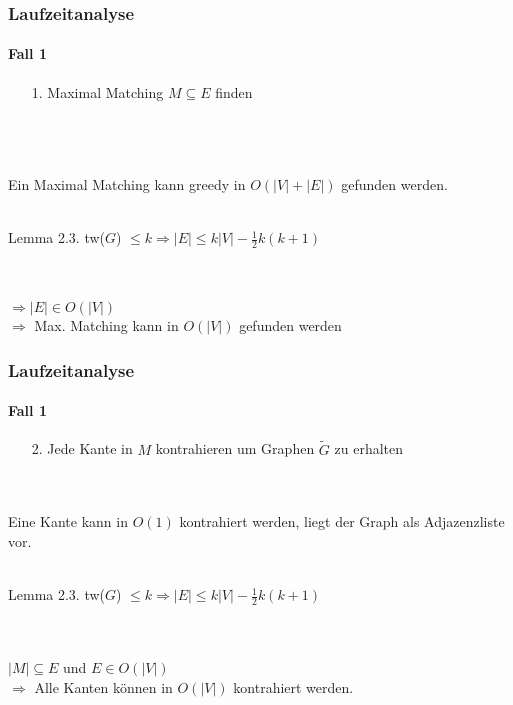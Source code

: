 
\begin{frame}
\frametitle{Laufzeitanalyse}
\framesubtitle{Fall 1}

\begin{enumerate}
	\item[1.] Maximal Matching $M \subseteq E$ finden
\end{enumerate}
\ \\
\ \\
\ \\
Ein Maximal Matching kann greedy in $O(|V|+|E|)$ gefunden werden. \\
\ \\


\begin{KITinfoblock}{Lemma 2.3.}
	tw($G$) $\leq k \Rightarrow |E| \leq k|V| - \frac{1}{2} k (k+1)$
\end{KITinfoblock}
\ \\
\ \\
$\Rightarrow |E| \in O(|V|)$ \\
$\Rightarrow$ Max. Matching kann in $O(|V|)$ gefunden werden
\end{frame}


\begin{frame}
\frametitle{Laufzeitanalyse}
\framesubtitle{Fall 1}

\begin{enumerate}
	\item[2.] Jede Kante in $M$ kontrahieren um Graphen $\widetilde{G}$ zu erhalten
\end{enumerate}
\ \\
\ \\
Eine Kante kann in $O(1)$ kontrahiert werden, liegt der Graph als Adjazenzliste vor.
\ \\
\ \\
\begin{KITinfoblock}{Lemma 2.3.}
	tw($G$) $\leq k \Rightarrow |E| \leq k|V| - \frac{1}{2} k (k+1)$
\end{KITinfoblock}
\ \\
\ \\
$|M| \subseteq E$ und $E \in O(|V|)$ \\
$\Rightarrow$ Alle Kanten können in $O(|V|)$ kontrahiert werden.
\end{frame}


